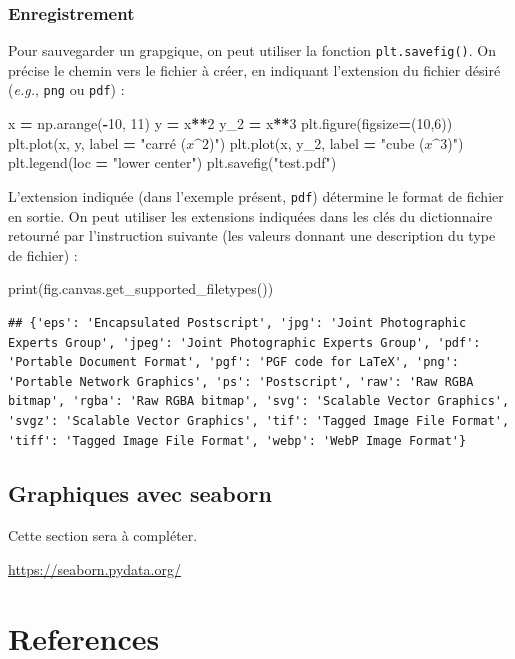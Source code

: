 \documentclass[
  12pt,
]{book}
\newenvironment{Shaded}{\begin{snugshade}}{\end{snugshade}}
\newcommand{\BuiltInTok}[1]{#1}
\newcommand{\DecValTok}[1]{\textcolor[rgb]{0.00,0.00,0.81}{#1}}
\newcommand{\NormalTok}[1]{#1}
\newcommand{\OperatorTok}[1]{\textcolor[rgb]{0.81,0.36,0.00}{\textbf{#1}}}
\newcommand{\StringTok}[1]{\textcolor[rgb]{0.31,0.60,0.02}{#1}}
\numberwithin{equation}{section}
\numberwithin{countremarque}{section}
\begin{document}
\subsection{Enregistrement}\label{enregistrement}

Pour sauvegarder un grapgique, on peut utiliser la fonction \texttt{plt.savefig()}. On précise le chemin vers le fichier à créer, en indiquant l'extension du fichier désiré (\emph{e.g.}, \texttt{png} ou \texttt{pdf}) :

\begin{Shaded}
\begin{Highlighting}[]
\NormalTok{x }\OperatorTok{=}\NormalTok{ np.arange(}\OperatorTok{{-}}\DecValTok{10}\NormalTok{, }\DecValTok{11}\NormalTok{)}
\NormalTok{y }\OperatorTok{=}\NormalTok{ x}\OperatorTok{**}\DecValTok{2}
\NormalTok{y\_2 }\OperatorTok{=}\NormalTok{ x}\OperatorTok{**}\DecValTok{3}
\NormalTok{plt.figure(figsize}\OperatorTok{=}\NormalTok{(}\DecValTok{10}\NormalTok{,}\DecValTok{6}\NormalTok{))}
\NormalTok{plt.plot(x, y, label }\OperatorTok{=} \StringTok{"carré ($x\^{}2$)"}\NormalTok{)}
\NormalTok{plt.plot(x, y\_2, label }\OperatorTok{=} \StringTok{"cube ($x\^{}3$)"}\NormalTok{)}
\NormalTok{plt.legend(loc }\OperatorTok{=} \StringTok{"lower center"}\NormalTok{)}
\NormalTok{plt.savefig(}\StringTok{"test.pdf"}\NormalTok{)}
\end{Highlighting}
\end{Shaded}

L'extension indiquée (dans l'exemple présent, \texttt{pdf}) détermine le format de fichier en sortie. On peut utiliser les extensions indiquées dans les clés du dictionnaire retourné par l'instruction suivante (les valeurs donnant une description du type de fichier) :

\begin{Shaded}
\begin{Highlighting}[]
\BuiltInTok{print}\NormalTok{(fig.canvas.get\_supported\_filetypes())}
\end{Highlighting}
\end{Shaded}

\begin{lstlisting}
## {'eps': 'Encapsulated Postscript', 'jpg': 'Joint Photographic Experts Group', 'jpeg': 'Joint Photographic Experts Group', 'pdf': 'Portable Document Format', 'pgf': 'PGF code for LaTeX', 'png': 'Portable Network Graphics', 'ps': 'Postscript', 'raw': 'Raw RGBA bitmap', 'rgba': 'Raw RGBA bitmap', 'svg': 'Scalable Vector Graphics', 'svgz': 'Scalable Vector Graphics', 'tif': 'Tagged Image File Format', 'tiff': 'Tagged Image File Format', 'webp': 'WebP Image Format'}
\end{lstlisting}

\section{Graphiques avec seaborn}\label{graphiques-avec-seaborn}

Cette section sera à compléter.

\url{https://seaborn.pydata.org/}

\chapter{References}\label{references}


\end{document}

